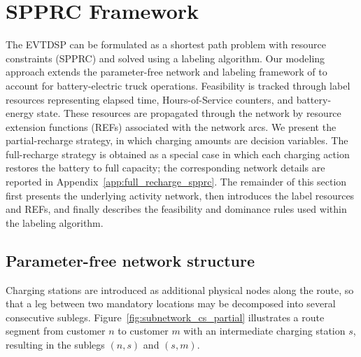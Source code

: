 \documentclass[3p,11pt,authoryear]{elsarticle}  %
\begin{document}


\section{SPPRC Framework} 


The EVTDSP can be formulated as a shortest path problem with resource constraints (SPPRC) and solved using a labeling algorithm. Our modeling approach extends the parameter-free network and labeling framework of \citet{goel2017exact} to account for battery-electric truck operations. Feasibility is tracked through label resources representing elapsed time, Hours-of-Service counters, and battery-energy state. These resources are propagated through the network by resource extension functions (REFs) associated with the network arcs. We present the partial-recharge strategy, in which charging amounts are decision variables. The full-recharge strategy is obtained as a special case in which each charging action restores the battery to full capacity; the corresponding network details are reported in Appendix~\ref{app:full_recharge_spprc}. The remainder of this section first presents the underlying activity network, then introduces the label resources and REFs, and finally describes the feasibility and dominance rules used within the labeling algorithm.


\subsection{Parameter-free network structure}


Charging stations are introduced as additional physical nodes along the route, so that a leg between two mandatory locations may be decomposed into several consecutive sublegs. Figure~\ref{fig:subnetwork_cs_partial} illustrates a route segment from customer $n$ to customer $m$ with an intermediate charging station $s$, resulting in the sublegs $(n,s)$ and $(s,m)$.
\end{document}
